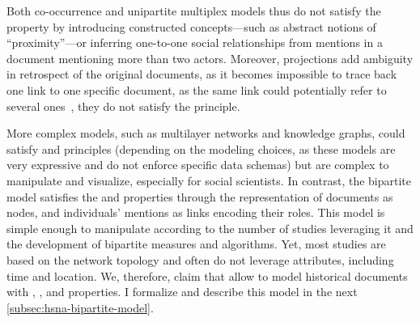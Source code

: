 Both co-occurrence and unipartite multiplex models thus do not satisfy the \reality property by introducing constructed concepts---such as abstract notions of ``proximity''---or inferring one-to-one social relationships from mentions in a document mentioning more than two actors.
Moreover, projections add ambiguity in retrospect of the original documents, as it becomes impossible to trace back one link to one specific document, as the same link could potentially refer to several ones~\cite{cristofoliAuxSourcesGrands2008}, \ie they do not satisfy the \traceability principle.

More complex models, such as multilayer networks and knowledge graphs, could satisfy \reality and \traceability principles (depending on the modeling choices, as these models are very expressive and do not enforce specific data schemas) but are complex to manipulate and visualize, especially for social scientists.
In contrast, the bipartite model satisfies the \reality and \traceability properties through the representation of documents as nodes, and individuals' mentions as links encoding their roles.
This model is simple enough to manipulate according to the number of \sna studies leveraging it \cite{lippPetitionsSocialContext2001, shafieHypergraphRepresentationsStudy2017, davisDeepSouthSocial2009, ochabDetectingOttokarII2022} and the development of \sna bipartite measures and algorithms\cite{borgattiSocialNetworkAnalysis2009, latapyBasicNotionsAnalysis2008, hambergerScanningPatternsRelationship2014}.
Yet, most \hsna studies are based on the network topology and often do not leverage attributes, including time and location.
We, therefore, claim that \modelplural allow to model historical documents with \traceability, \reality, and \simplicity properties.
I formalize and describe this model in the next \autoref{subsec:hsna-bipartite-model}.



